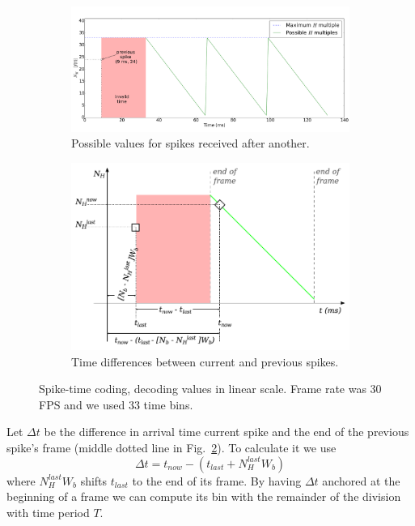 \documentclass[conference]{IEEEtran}
\begin{document}
\begin{figure}[htb]
  
  \centering
  
  \begin{subfigure}[b]{0.45\textwidth}
    \includegraphics[width=\textwidth]{spike_values_linear}
    \caption{Possible values for spikes received after another.}
    \label{fig:linear_time_all}
  \end{subfigure}
  
  \begin{subfigure}[b]{0.45\textwidth}
    \includegraphics[width=\textwidth]{new_val_calc_linear}
    \caption{Time differences between current and previous spikes.}
    \label{fig:linear_time_calc}
  \end{subfigure}
  \caption{Spike-time coding, decoding values in linear scale. Frame rate was 30 FPS and we used 33 time bins.}
  \label{fig:linear_time}
\end{figure} 


Let $\Delta t$ be the difference in arrival time current spike and the end of the previous spike's frame (middle dotted line in  Fig.~\ref{fig:linear_time_calc}). To calculate it we use
\begin{equation}
\Delta t = t_{now} -  \left(t_{last} + N_{H}^{last}W_{b}\right)
\label{eq:time_diff}
\end{equation}
where $N_{H}^{last}W_{b}$ shifts $t_{last}$ to the end of its frame. By having $\Delta t$ anchored at the beginning of a frame we can compute its bin with the remainder of the division with time period $T$.
\end{document}
